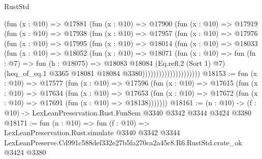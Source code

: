 \begin{lexlean}{RustStd}
\begin{coremodule}
                    (fun (x : @10) =>
                    @17881
                      (fun (x : @10) =>
                      @17900
                        (fun (x : @10) =>
                        @17919
                          (fun (x : @10) =>
                          @17938
                            (fun (x : @10) =>
                            @17957
                              (fun (x : @10) =>
                              @17976
                                (fun (x : @10) =>
                                @17995
                                  (fun (x : @10) =>
                                  @18014
                                    (fun (x : @10) =>
                                    @18033
                                      (fun (x : @10) =>
                                      @18052
                                        (fun (x : @10) =>
                                        @18071
                                          (fun (x : @10) =>
                                          fun (fn : @7) =>
                                          fun (h : @18075) =>
                                          @18083
                                            @18084
                                            (Eq.refl.{2} (Sort 1) @7)
                                            (heq_of_eq.{1}
                                              @3365
                                              @18081
                                              @18084
                                              @3380)))))))))))))))))))))
@18153 := fun (x : @10) =>
  @17577
    (fun (x : @10) =>
    @17596
      (fun (x : @10) =>
      @17615
        (fun (x : @10) =>
        @17634
          (fun (x : @10) =>
          @17653 (fun (x : @10) => @17672 (fun (x : @10) => @17691 (fun (x : @10) => @18138)))))))
@18161 := (n : @10) -> (f : @10) -> LexLeanPreservation.Rust.FunSem @3340 @3342 @3344 @3424 @3380
@18171 := fun (n : @10) =>
  fun (f : @10) =>
  LexLeanPreservation.Rust.simulate
    @3340
    @3342
    @3344
    LexLeanPreserve.Cd991c588def332e27b5fa270ca2a45c8.R6.RustStd.crate_ok
    @3424
    @3380
\end{coremodule}
\end{lexlean}
